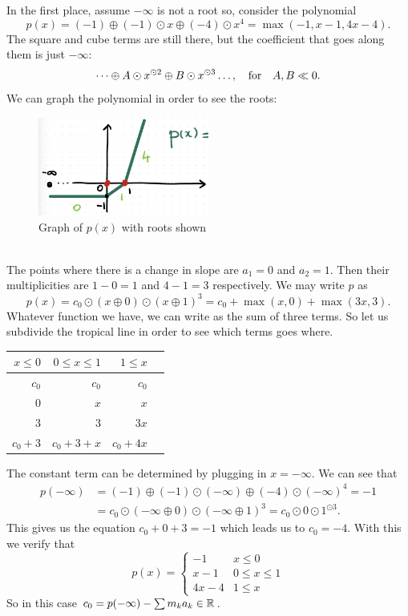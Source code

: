 \documentclass[12pt]{memoir}
\begin{document}
\begin{Ex}
In the first place, assume $-\infty$ is not a root so, consider the polynomial 
$$p(x)=(-1)\oplus(-1)\odot x\oplus(-4)\odot x^4=\max(-1,x-1,4x-4).$$
The square and cube terms are still there, but the coefficient that goes along them is just $-\infty$:
$$\dots\oplus A\odot x^{\odot 2}\oplus B\odot x^{\odot 3}\dots,\quad\text{for}\quad A,B\ll 0.$$
We can graph the polynomial in order to see the roots:
\begin{figure}[h!]
    \centering
    \includegraphics[width=0.5\textwidth]{figs/fig4-1-InfinityNotRoot.png}
    \caption{Graph of $p(x)$ with roots shown}
    \label{fig:4.1-InfinityNotRoot}
\end{figure}\\
The points where there is a change in slope are $a_1=0$ and $a_2=1$. Then their multiplicities are $1-0=1$ and $4-1=3$ respectively. We may write $p$ as 
$$p(x)=c_0\odot(x\oplus 0)\odot(x\oplus 1)^{3}=c_0+\max(x,0)+\max(3x,3).$$
Whatever function we have, we can write as the sum of three terms. So let us subdivide the tropical line in order to see which terms goes where.
\begin{table}[h!]
    \centering
    \begin{tabular}{rrrr}\toprule
        $x\leq 0$ & $0\leq x\leq 1$ & $1\leq x$\\ \midrule
        $c_0$& $c_0$&$c_0$\\
        $0$&$x$ & $x$\\
        $3$& $3$ & $3x$\\ \midrule
        $c_0+3$&$c_0+3+x$&$c_0+4x$\\
   \bottomrule
    \end{tabular}
    \end{table}
    The constant term can be determined by plugging in $x=-\infty$. We can see that 
    \begin{align*}
        p(-\infty)&=(-1)\oplus(-1)\odot (-\infty)\oplus(-4)\odot (-\infty)^4=-1\\
        &=c_0\odot(-\infty\oplus 0)\odot(-\infty\oplus 1)^3=c_0\odot0\odot 1^{\odot 3}.
    \end{align*}
    This gives us the equation $c_0+0+3=-1$ which leads us to $c_0=-4$. With this we verify that 
    $$p(x)=\begin{cases}
        -1&x\leq 0\\
        x-1&0\leq x\leq 1\\
        4x-4&1\leq x
    \end{cases}$$
    So in this case $c_0=p(-\infty)-\sum m_ka_k\in\mathbb{R}$.
\end{Ex}
\end{document}

